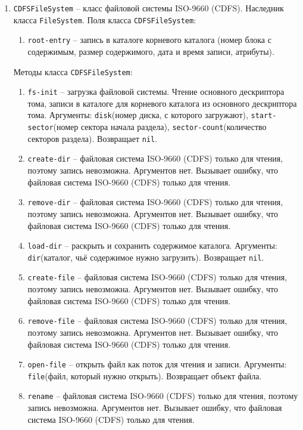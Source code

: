 \begin{enumerate}
\item \texttt{CDFSFileSystem} -- класс файловой системы ISO-9660 (CDFS). Наследник класса \texttt{FileSystem}. Поля класса \texttt{CDFSFileSystem}:

	\begin{enumerate}
	\item \texttt{root-entry} -- запись в каталоге корневого каталога (номер блока с содержимым, размер содержимого, дата и время записи, атрибуты).
	\end{enumerate}
	
Методы класса \texttt{CDFSFileSystem}:

\begin{enumerate}
	\item \texttt{fs-init} -- загрузка файловой системы. Чтение основного дескриптора тома, записи в каталоге для корневого каталога из основного дескриптора тома. Аргументы: \texttt{disk}(номер диска, с которого загружают), \texttt{start-sector}(номер сектора начала раздела), \texttt{sector-count}(количество секторов раздела). Возвращает \texttt{nil}.
	\item \texttt{create-dir} -- файловая система ISO-9660 (CDFS) только для чтения, поэтому запись невозможна. Аргументов нет. Вызывает ошибку, что файловая система ISO-9660 (CDFS) только для чтения.
	\item \texttt{remove-dir} -- файловая система ISO-9660 (CDFS) только для чтения, поэтому запись невозможна. Аргументов нет. Вызывает ошибку, что файловая система ISO-9660 (CDFS) только для чтения.
	\item \texttt{load-dir} -- раскрыть и сохранить содержимое каталога. Аргументы: \texttt{dir}(каталог, чьё содержимое нужно загрузить). Возвращает \texttt{nil}.
	\item \texttt{create-file} -- файловая система ISO-9660 (CDFS) только для чтения, поэтому запись невозможна. Аргументов нет. Вызывает ошибку, что файловая система ISO-9660 (CDFS) только для чтения.
	\item \texttt{remove-file} -- файловая система ISO-9660 (CDFS) только для чтения, поэтому запись невозможна. Аргументов нет. Вызывает ошибку, что файловая система ISO-9660 (CDFS) только для чтения.
	\item \texttt{open-file} -- открыть файл как поток для чтения и записи. Аргументы: \texttt{file}(файл, который нужно открыть). Возвращает объект файла.
	\item \texttt{rename} -- файловая система ISO-9660 (CDFS) только для чтения, поэтому запись невозможна. Аргументов нет. Вызывает ошибку, что файловая система ISO-9660 (CDFS) только для чтения.

\end{enumerate}
\end{enumerate}
